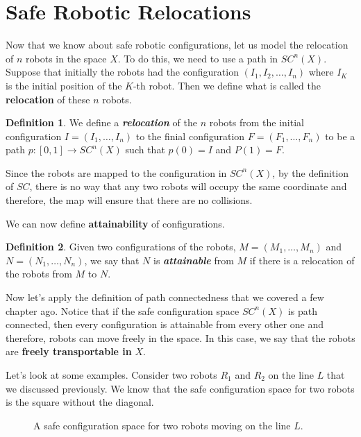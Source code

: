 \documentclass[12pt]{article}
\theoremstyle{definition}
\newtheorem*{definition}{Definition}
\begin{document}
\section*{\centering Safe Robotic Relocations}
Now that we know about safe robotic configurations, let us model the relocation
of $n$ robots in the space $X$. To do this, we need to use a path in $SC^n(X)$.
Suppose that initially the robots had the configuration $(I_1, I_2, \dots, I_n)$
where $I_K$ is the initial position of the $K$-th robot. Then we define what is
called the \textbf{relocation} of these $n$ robots.

\begin{definition}
\cite{11} We define a \textit{\textbf{relocation}} of the $n$ robots from the initial configuration
$I = (I_1, \dots, I_n)$ to the finial configuration $F = (F_1, \dots, F_n)$ to be a path
$p : [0, 1] \to SC^n(X)$ such that $p(0) = I$ and $P(1) = F$.
\end{definition}

Since the robots are mapped to the configuration in $SC^n(X)$, by the definition of $SC$,
there is no way that any two robots will occupy the same coordinate and therefore, the map
will ensure that there are no collisions.

\bigskip

We can now define \textbf{attainability} of configurations.

\begin{definition}
\cite{12} Given two configurations of the robots, $M = (M_1, \dots, M_n)$ and $N = (N_1, \dots, N_n)$,
we say that $N$ is \textit{\textbf{attainable}} from $M$ if there is a relocation of the robots
from $M$ to $N$.
\end{definition}

Now let's apply the definition of path connectedness that we covered a few chapter ago.
Notice that if the safe configuration space $SC^n(X)$ is path connected, then every configuration
is attainable from every other one and therefore, robots can move freely in the space.
In this case, we say that the robots are \textbf{freely transportable in} $X$.

\bigskip

Let's look at some examples. Consider two robots $R_1$ and $R_2$ on the line $L$ that we discussed previously.
We know that the safe configuration space for two robots is the square without the diagonal.

\begin{figure}[H]
    \centering
    \caption*{A safe configuration space for two robots moving on the line $L$.}
\end{figure}
\end{document}
